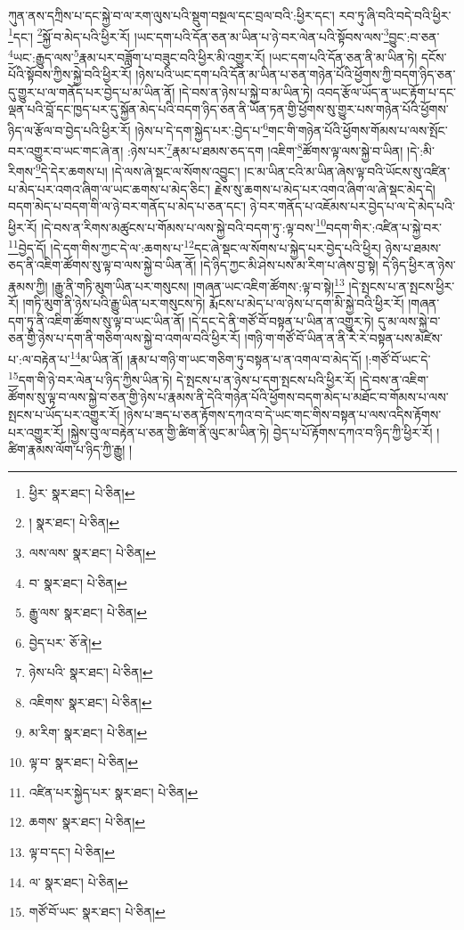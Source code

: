 ཀུན་ནས་དཀྲིས་པ་དང་སྐྱེ་བ་ལ་རག་ལུས་པའི་སྡུག་བསྔལ་དང་བྲལ་བའི་:ཕྱིར་དང་། རབ་ཏུ་ཞི་བའི་བདེ་བའི་ཕྱིར་\footnote{ཕྱིར་  སྣར་ཐང་།  པེ་ཅིན། }དང་། \footnote{།    སྣར་ཐང་།  པེ་ཅིན། }སྐྱོ་བ་མེད་པའི་ཕྱིར་རོ། །ཡང་དག་པའི་དོན་ཅན་མ་ཡིན་པ་ཉེ་བར་ལེན་པའི་སྟོབས་ལས་\footnote{ལས་ལས་  སྣར་ཐང་།  པེ་ཅིན། }བྱུང་:བ་ཅན་\footnote{བ་  སྣར་ཐང་།  པེ་ཅིན། }ཡང་:རྒྱུད་ལས་\footnote{རྒྱུ་ལས་  སྣར་ཐང་།  པེ་ཅིན། }རྣམ་པར་བཟློག་པ་བཟུང་བའི་ཕྱིར་མི་འགྱུར་རོ། །ཡང་དག་པའི་དོན་ཅན་ནི་མ་ཡིན་ཏེ། དངོས་པོའི་སྟོབས་ཀྱིས་སྐྱེ་བའི་ཕྱིར་རོ། །ཉེས་པའི་ཡང་དག་པའི་དོན་མ་ཡིན་པ་ཅན་གཉེན་པོའི་ཕྱོགས་ཀྱི་བདག་ཉིད་ཅན་དུ་གྱུར་པ་ལ་གནོད་པར་བྱེད་པ་མ་ཡིན་ནོ། །དེ་བས་ན་ཉེས་པ་སྐྱེ་བ་མ་ཡིན་ཏེ། འབད་རྩོལ་ཡོད་ན་ཡང་རྟོག་པ་དང་ལྡན་པའི་བློ་དང་ཁྱད་པར་དུ་སྐྱོན་མེད་པའི་བདག་ཉིད་ཅན་ནི་ཡོན་ཏན་གྱི་ཕྱོགས་སུ་གྱུར་པས་གཉེན་པོའི་ཕྱོགས་ཉིད་ལ་རྩོལ་བ་བྱེད་པའི་ཕྱིར་རོ། །ཉེས་པ་དེ་དག་སྐྱེད་པར་:བྱེད་པ་\footnote{བྱེད་པར་  ཅོ་ནེ། }གང་གི་གཉེན་པོའི་ཕྱོགས་གོམས་པ་ལས་སྤོང་བར་འགྱུར་བ་ཡང་གང་ཞེ་ན། :ཉེས་པར་\footnote{ཉེས་པའི་  སྣར་ཐང་།  པེ་ཅིན། }རྣམ་པ་ཐམས་ཅད་དག །འཇིག་\footnote{འཇིགས་  སྣར་ཐང་།  པེ་ཅིན། }ཚོགས་ལྟ་ལས་སྐྱེ་བ་ཡིན། །དེ་:མི་རིགས་\footnote{མ་རིག་  སྣར་ཐང་།  པེ་ཅིན། }དེ་དེར་ཆགས་པ། །དེ་ལས་ཞེ་སྡང་ལ་སོགས་འབྱུང་། །ང་མ་ཡིན་ངའི་མ་ཡིན་ཞེས་ལྟ་བའི་ཡོངས་སུ་འཛིན་པ་མེད་པར་འགའ་ཞིག་ལ་ཡང་ཆགས་པ་མེད་ཅིང་། རྗེས་སུ་ཆགས་པ་མེད་པར་འགའ་ཞིག་ལ་ཞེ་སྡང་མེད་དེ། བདག་མེད་པ་བདག་གི་ལ་ཉེ་བར་གནོད་པ་མེད་པ་ཅན་དང་། ཉེ་བར་གནོད་པ་འཇོམས་པར་བྱེད་པ་ལ་དེ་མེད་པའི་ཕྱིར་རོ། །དེ་བས་ན་རིགས་མཚུངས་པ་གོམས་པ་ལས་སྐྱེ་བའི་བདག་ཏུ་:ལྟ་བས་\footnote{ལྟ་བ་  སྣར་ཐང་།  པེ་ཅིན། }བདག་གིར་:འཛིན་པ་སྐྱེ་བར་\footnote{འཛིན་པར་སྐྱེད་པར་  སྣར་ཐང་།  པེ་ཅིན། }བྱེད་དོ། །དེ་དག་གིས་ཀྱང་དེ་ལ་:ཆགས་པ་\footnote{ཆགས་  སྣར་ཐང་།  པེ་ཅིན། }དང་ཞེ་སྡང་ལ་སོགས་པ་སྐྱེད་པར་བྱེད་པའི་ཕྱིར། ཉེས་པ་ཐམས་ཅད་ནི་འཇིག་ཚོགས་སུ་ལྟ་བ་ལས་སྐྱེ་བ་ཡིན་ནོ། །དེ་ཉིད་ཀྱང་མི་ཤེས་པས་མ་རིག་པ་ཞེས་བྱ་སྟེ། དེ་ཉིད་ཕྱིར་ན་ཉེས་རྣམས་ཀྱི། །རྒྱུ་ནི་གཏི་མུག་ཡིན་པར་གསུངས། །གཞན་ཡང་འཇིག་ཚོགས་:ལྟ་བ་སྟེ།\footnote{ལྟ་བ་དང་།  པེ་ཅིན། } །དེ་སྤངས་པ་ན་སྤངས་ཕྱིར་རོ། །གཏི་མུག་ནི་ཉེས་པའི་རྒྱུ་ཡིན་པར་གསུངས་ཏེ། རྨོངས་པ་མེད་པ་ལ་ཉེས་པ་དག་མི་སྐྱེ་བའི་ཕྱིར་རོ། །གཞན་དག་ཏུ་ནི་འཇིག་ཚོགས་སུ་ལྟ་བ་ཡང་ཡིན་ནོ། །དེ་དང་དེ་ནི་གཙོ་བོ་བསྟན་པ་ཡིན་ན་འགྱུར་ཏེ། དུ་མ་ལས་སྐྱེ་བ་ཅན་གྱི་ཉེས་པ་དག་ནི་གཅིག་ལས་སྐྱེ་བ་འགལ་བའི་ཕྱིར་རོ། །གཉི་ག་གཙོ་བོ་ཡིན་ན་ནི་རེ་རེ་བསྟན་པས་མཛེས་པ་:ལ་བརྟེན་པ་\footnote{ལ་  སྣར་ཐང་།  པེ་ཅིན། }མ་ཡིན་ནོ། །རྣམ་པ་གཉི་ག་ཡང་གཅིག་ཏུ་བསྟན་པ་ན་འགལ་བ་མེད་དོ། །:གཙོ་བོ་ཡང་དེ་\footnote{གཙོ་བོ་ཡང་  སྣར་ཐང་།  པེ་ཅིན། }དག་གི་ཉེ་བར་ལེན་པ་ཉིད་ཀྱིས་ཡིན་ཏེ། དེ་སྤངས་པ་ན་ཉེས་པ་དག་སྤངས་པའི་ཕྱིར་རོ། །དེ་བས་ན་འཇིག་ཚོགས་སུ་ལྟ་བ་ལས་སྐྱེ་བ་ཅན་གྱི་ཉེས་པ་རྣམས་ནི་དེའི་གཉེན་པོའི་ཕྱོགས་བདག་མེད་པ་མཐོང་བ་གོམས་པ་ལས་སྤངས་པ་ཡོད་པར་འགྱུར་རོ། །ཉེས་པ་ཟད་པ་ཅན་རྟོགས་དཀའ་བ་དེ་ཡང་གང་གིས་བསྟན་པ་ལས་འདིས་རྟོགས་པར་འགྱུར་རོ། །སྐྱེས་བུ་ལ་བརྟེན་པ་ཅན་གྱི་ཚིག་ནི་ལུང་མ་ཡིན་ཏེ། བྱེད་པ་པོ་རྟོགས་དཀའ་བ་ཉིད་ཀྱི་ཕྱིར་རོ། །ཚིག་རྣམས་ལོག་པ་ཉིད་ཀྱི་རྒྱུ། །
